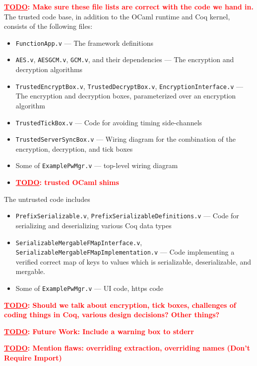 \documentclass{article}
\newcommand{\todo}[1]{\textbf{\textcolor{red}{\underline{TODO}: #1}}}
\begin{document}
\todo{Make sure these file lists are correct with the code we hand in.}
The trusted code base, in addition to the OCaml runtime and Coq kernel, consists of the following files:
\begin{itemize}
  \item \texttt{FunctionApp.v} --- The framework definitions
  \item \texttt{AES.v}, \texttt{AESGCM.v}, \texttt{GCM.v}, and their dependencies --- The encryption and decryption algorithms
  \item \texttt{TrustedEncryptBox.v}, \texttt{TrustedDecryptBox.v}, \texttt{EncryptionInterface.v} --- The encryption and decryption boxes, parameterized over an encryption algorithm
  \item \texttt{TrustedTickBox.v} --- Code for avoiding timing side-channels
  \item \texttt{TrustedServerSyncBox.v} --- Wiring diagram for the combination of the encryption, decryption, and tick boxes
  \item Some of \texttt{ExamplePwMgr.v} --- top-level wiring diagram
  \item \todo{trusted OCaml shims}
\end{itemize}


The untrusted code includes
\begin{itemize}
  \item \texttt{PrefixSerializable.v}, \texttt{PrefixSerializableDefinitions.v} --- Code for serializing and deserializing various Coq data types
  \item \texttt{SerializableMergableFMapInterface.v}, \texttt{SerializableMergableFMapImplementation.v} --- Code implementing a verified correct map of keys to values which is serializable, deserializable, and mergable.
  \item Some of \texttt{ExamplePwMgr.v} --- UI code, https code
\end{itemize}

\todo{Should we talk about encryption, tick boxes, challenges of coding things in Coq, various design decisions?  Other things?}

\todo{Future Work: Include a warning box to stderr}

\todo{Mention flaws: overriding extraction, overriding names (Don't Require Import)}
\end{document}
